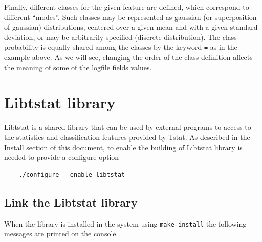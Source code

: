 \documentclass[11pt]{article}
\begin{document}
Finally, different classes for the given feature are defined, which correspond to different
``modes''. Such classes may be represented as gaussian (or superposition of gaussian) distributions,
centered over a given mean and with a  given standard deviation, or may be arbitrarily specified (discrete 
distribution). The class probability is equally shared among the classes by the keyword 
\texttt{=} as in the example above. As we will see, changing the order of the class definition
affects the meaning of some of the logfile fields values.

\section{Libtstat library\label{Libtstat_library}}


Libtstat is a shared library that can be used by external programs to access to
the statistics and classification features provided by Tstat. 
As described in the Install section of this document, to enable the building of
Libtstat library is needed to provide a configure option

\begin{small}\begin{verbatim}
    ./configure --enable-libtstat
\end{verbatim}\end{small} \noindent
\subsection{Link the Libtstat library\label{Link_the_Libtstat_library}}


When the library is installed in the system using \texttt{make install} the
following messages are printed on the console
\end{document}
